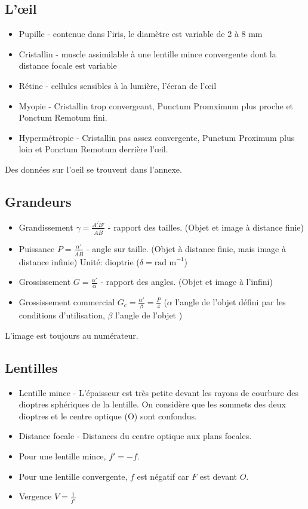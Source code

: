 \documentclass[openany]{book}
\begin{document}
\subsection{L’œil}
\begin{itemize}
    \item Pupille - contenue dans l'iris, le diamètre est variable de 2 à 8 mm
    \item Cristallin - muscle assimilable à une lentille mince convergente dont la distance focale est variable
    \item Rétine - cellules sensibles à la lumière, l'écran de l'œil
    \item Myopie - Cristallin trop convergeant, Punctum Promximum plus proche et Ponctum Remotum fini.
    \item Hypermétropie - Cristallin pas assez convergente, Punctum Proximum plus loin et Ponctum Remotum derrière l'œil. 
\end{itemize}

Des données sur l'oeil se trouvent dans l'annexe. 

\subsection{Grandeurs}
\begin{itemize}
    \item Grandissement $ \gamma = \frac{\overline{A'B'}}{\overline{AB}} $ - rapport des tailles. (Objet et image à distance finie)
    \item Puissance $ P = \frac{\alpha '}{\overline{AB}} $ - angle sur taille. (Objet à distance finie, mais image à distance infinie) Unité: dioptrie ($ \delta = \text{rad m}^{-1}  $)
    \item Grossissement $ G = \frac{\alpha '}{\alpha } $ - rapport des angles. (Objet et image à l'infini) 
    \item Grossissement commercial $ G_c = \frac{\alpha '}{\beta} = \frac{P}{4} $ ($\alpha$ l'angle de l'objet défini par les conditions d'utilisation, $\beta$ l'angle de l'objet )
\end{itemize}
L'image est toujours au numérateur.

\subsection{Lentilles}
\begin{itemize}
    \item Lentille mince - L'épaisseur est très petite devant les rayons de courbure des dioptres sphériques de la lentille. On considère que les sommets des deux dioptres et le centre optique (O) sont confondus. 
    \item Distance focale - Distances du centre optique aux plans focales. 
    \item Pour une lentille mince, $ f' = -f $. 
    \item Pour une lentille convergente, $f$ est négatif car $F$ est devant $O$. 
    \item Vergence $V=\frac{1}{f'}$
\end{itemize}
\end{document}
